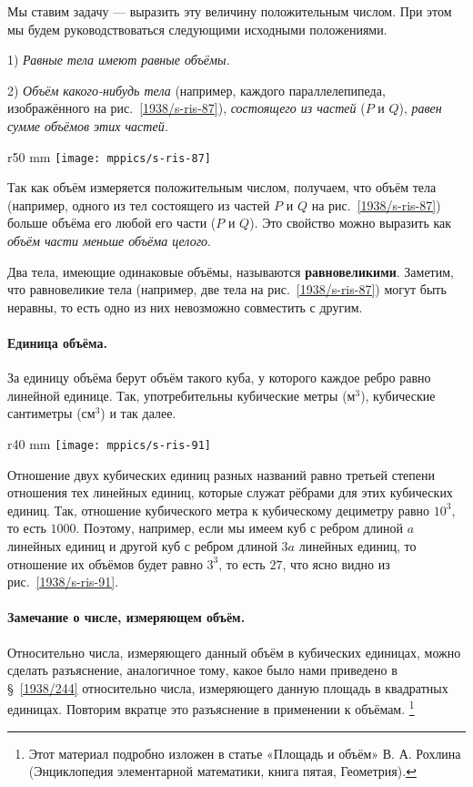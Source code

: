 Мы ставим задачу — выразить эту величину положительным числом.
При этом мы будем руководствоваться следующими исходными положениями.

1) \emph{Равные тела имеют равные объёмы.}

2) \emph{Объём какого-нибудь тела}
(например, каждого параллелепипеда, изображённого на рис.~\ref{1938/s-ris-87}),
\emph{состоящего из частей}
($P$ и $Q$),
\emph{равен сумме объёмов этих частей.}

\begin{wrapfigure}{r}{50 mm}
\vskip-0mm
\centering
\texttt{[image: mppics/s-ris-87]}
\caption{}\label{1938/s-ris-87}
\vskip-0mm
\end{wrapfigure}

Так как объём измеряется положительным числом, получаем, что 
объём тела (например, одного из тел состоящего из частей $P$ и $Q$ на рис.~\ref{1938/s-ris-87})
больше объёма его любой его части ($P$ и $Q$).
Это свойство можно выразить как \emph{объём части меньше объёма целого}.

Два тела, имеющие одинаковые объёмы, называются \textbf{равновеликими}.
Заметим, что равновеликие тела (например, две тела на рис.~\ref{1938/s-ris-87}) могут быть неравны, то есть одно из них невозможно совместить с другим.

\paragraph{Единица объёма.}\label{1938/s83}
За единицу объёма берут объём такого куба, у которого каждое ребро равно линейной единице.
Так, употребительны кубические метры (м$^3$), кубические сантиметры (см$^3$) и так далее.

\begin{wrapfigure}{r}{40 mm}
\vskip-0mm
\centering
\texttt{[image: mppics/s-ris-91]}
\caption{}\label{1938/s-ris-91}
\vskip-0mm
\end{wrapfigure}

Отношение двух кубических единиц разных названий равно третьей степени отношения тех линейных единиц, которые служат рёбрами для этих кубических единиц.
Так, отношение кубического метра к кубическому дециметру равно $10^3$, то есть $1000$.
Поэтому, например, если мы имеем куб с ребром длиной $a$ линейных единиц и другой куб с ребром длиной $3a$ линейных единиц, то отношение их объёмов будет равно $3^3$, то есть $27$, что ясно видно из рис.~\ref{1938/s-ris-91}.

\paragraph{Замечание о числе, измеряющем объём.}\label{1930/366}
Относительно числа, измеряющего данный объём в кубических единицах, можно сделать разъяснение, аналогичное тому, какое было нами приведено в §~\ref{1938/244}
относительно числа, измеряющего данную площадь в квадратных единицах.
Повторим вкратце это разъяснение в применении к объёмам.%
\footnote{Этот материал подробно изложен в статье «Площадь и объём» В. А. Рохлина (Энциклопедия элементарной математики, книга пятая, Геометрия).}

